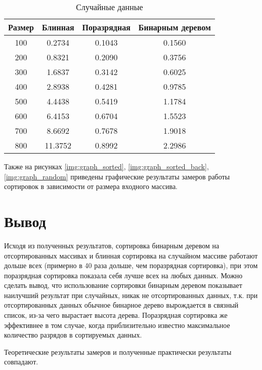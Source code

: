 \begin{table}[h]
	\begin{center}
		\begin{threeparttable}
		\captionsetup{justification=raggedleft,singlelinecheck=off}
		\caption{Случайные данные}
		\label{tbl:random}
		\begin{tabular}{|c|c|c|c|}
			\hline
			 Размер & Блинная &  Поразрядная &  Бинарным деревом \\
			\hline
			100 & 0.2734 & 0.1043 & 0.1560 \\ 
			\hline
			200 & 0.8321 & 0.2090 & 0.3756 \\ 
			\hline
			300 & 1.6837 & 0.3142 & 0.6025 \\ 
			\hline
			400 & 2.8938 & 0.4281 & 0.9785 \\ 
			\hline
			500 & 4.4438 & 0.5419 & 1.1784 \\ 
			\hline
			600 & 6.4153 & 0.6704 & 1.5523 \\ 
			\hline
			700 & 8.6692 & 0.7678 & 1.9018 \\ 
			\hline
			800 & 11.3752 & 0.8992 & 2.2986 \\ 
			\hline
		\end{tabular}
		\end{threeparttable}
    \end{center}
\end{table}


Также на рисунках \ref{img:graph_sorted}, \ref{img:graph_sorted_back}, \ref{img:graph_random} приведены графические результаты замеров работы сортировок в зависимости от размера входного массива.


\clearpage

\section*{Вывод}
Исходя из полученных результатов, сортировка бинарным деревом на отсортированных массивах и блинная сортировка на случайном массиве работают дольше всех (примерно в 40 раза дольше, чем поразрядная сортировка), при этом поразрядная сортировка показала себя лучше всех на любых данных. Можно сделать вывод, что использование сортировки бинарным деревом показывает наилучший результат при случайных, никак не отсортированных данных, т.к. при отсортированных данных обычное бинарное дерево вырождается в связный список, из-за чего вырастает высота дерева. Поразрядная сортировка же эффективнее в том случае, когда приблизительно известно максимальное количество разрядов в сортируемых данных.

Теоретические результаты замеров и полученные практически результаты совпадают.